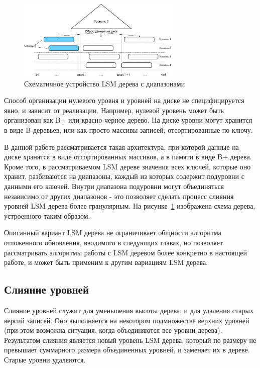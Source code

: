 \documentclass[a4paper,hidelinks,12pt]{article}
\begin{document}
\begin{figure}
\centering
\includegraphics[width=0.7\textwidth]{compaction_schema}
\caption{Схематичное устройство LSM дерева с диапазонами}
\label{fig:compaction_schema}
\end{figure}

Способ организации нулевого уровня и уровней на диске не специфицируется явно,
и зависит от реализации. Например, нулевой уровень может быть организован как
B+ или красно-черное дерево. На диске уровни могут хранится в виде B деревьев,
или как просто массивы записей, отсортированные по ключу.

В данной работе рассматривается такая архитектура, при которой данные на диске
хранятся в виде отсортированных массивов, а в памяти в виде B+ дерева. Кроме
того, в рассматриваемом LSM дереве значения всех ключей, которые оно хранит,
разбиваются на диапазоны, каждый из которых содержит подуровни с данными его
ключей. Внутри диапазона подуровни могут объединяться независимо от других
диапазонов - это позволяет сделать процесс слияния уровней LSM дерева более
гранулярным. На рисунке~\ref{fig:compaction_schema} изображена схема дерева,
устроенного таким образом.

Описанный вариант LSM дерева не ограничивает общности алгоритма отложенного
обновления, вводимого в следующих главах, но позволяет рассматривать алгоритмы
работы с LSM деревом более конкретно в настоящей работе, и может быть применим к
другим вариациям LSM дерева.

\subsection{Слияние уровней}

Слияние уровней служит для уменьшения высоты дерева, и для удаления старых
версий записей. Оно выполняется на некотором подмножестве верхних уровней (при
этом возможна ситуация, когда объединяются все уровни дерева). Результатом
слияния является новый уровень LSM дерева, который по размеру не превышает
суммарного размера объединенных уровней, и заменяет их в дереве. Старые уровни
удаляются.
\end{document}
